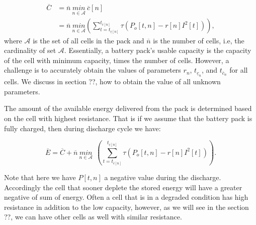 \documentclass[10pt,twocolumn]{IEEEtran}
\begin{document}
\begin{equation}
\begin{split}
\overline{C} &=\overline{n} \ \underset{n\in \mathcal{A}}{min} \ \overline{c}[n] \\
&=\overline{n} \ \underset{n\in \mathcal{A}}{min}  \left(   \sum_{t=t_{\underline{c}[n]}}^{t_{\overline{c}[n]}}  \tau(P_{o}[t,n] - r[n]I^2[t]) \right),
\end{split}
\label{eq:lhscap}
\end{equation}
\noindent where $\mathcal{A}$ is the set of all cells in the pack and $\overline{n}$ is the number of cells, i.e, the cardinality of set $\mathcal{A}$. 
Essentially, a battery pack's usable capacity is the capacity of the cell with minimum capacity, times the number of cells.
However,  a challenge is to accurately obtain the values of parameters $r_n$, $t_{\underline{c}_n} $,  and $t_{\overline{c}_n} $ for all cells.
We discuss in section ??, how to obtain the  value of all  unknown parameters.

The amount of the available energy delivered from the pack is determined based on the cell with highest resistance. 
That is if we assume that the battery pack is fully charged, then during discharge cycle we have:

\begin{equation}
\overline{E} = \overline{C} +  \overline{n} \ \underset{n\in \mathcal{A}}{min} \ \ \left(   \sum_{t=t_{\overline{c}[n]}}^{   t_{\underline{c}[n]}}  \tau(P_{o}[t,n] - r[n]I^2[t]) \right).
\label{available_energy}
\end{equation}

Note that here we have $P[t,n]$ a negative value during the discharge. Accordingly the cell that sooner deplete the stored energy will have a greater negative of sum of energy.
Often a cell that is in a degraded condition has  high resistance in addition to the low capacity, however, as we will see in the section ??, we can have other cells as well with similar resistance.
%
%
\end{document}
